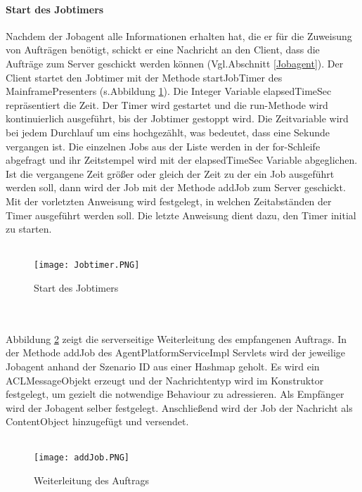 \paragraph{Start des Jobtimers} 
Nachdem der Jobagent alle Informationen erhalten hat, die er für die Zuweisung von Aufträgen benötigt, schickt er eine Nachricht an den Client, dass die Aufträge zum Server geschickt werden können (Vgl.Abschnitt \ref{Jobagent}). Der Client startet den Jobtimer mit der Methode startJobTimer des MainframePresenters (s.Abbildung \ref{jobtim}). Die Integer Variable elapsedTimeSec repräsentiert die Zeit. Der Timer wird gestartet und die run-Methode wird kontinuierlich ausgeführt, bis der Jobtimer gestoppt wird. Die Zeitvariable wird bei jedem Durchlauf um eins hochgezählt, was bedeutet, dass eine Sekunde vergangen ist. Die einzelnen Jobs aus der Liste werden in der for-Schleife abgefragt und ihr Zeitstempel wird mit der elapsedTimeSec Variable abgeglichen. Ist die vergangene Zeit größer oder gleich der Zeit zu der ein Job ausgeführt werden soll, dann wird der Job mit der Methode addJob zum Server geschickt. Mit der vorletzten Anweisung wird festgelegt, in welchen Zeitabständen der Timer ausgeführt werden soll. Die letzte Anweisung dient dazu, den Timer initial zu starten.
\\\\
\begin{figure}[h!]
	\centering
		\texttt{[image: Jobtimer.PNG]}        
		\caption{Start des Jobtimers}
	\label{jobtim}
\end{figure}
\\\\
Abbildung \ref{jobtimserv} zeigt die serverseitige Weiterleitung des empfangenen Auftrags. In der Methode addJob des AgentPlatformServiceImpl Servlets wird der jeweilige Jobagent anhand der Szenario ID aus einer Hashmap geholt. Es wird ein ACLMessageObjekt erzeugt und der Nachrichtentyp wird im Konstruktor festgelegt, um gezielt die notwendige Behaviour zu adressieren. Als Empfänger wird der Jobagent selber festgelegt. Anschließend wird der Job der Nachricht als ContentObject hinzugefügt und versendet.
\\\\
\begin{figure}[h!]
	\centering
		\texttt{[image: addJob.PNG]}        
		\caption{Weiterleitung des Auftrags}
	\label{jobtimserv}
\end{figure}
\newpage
